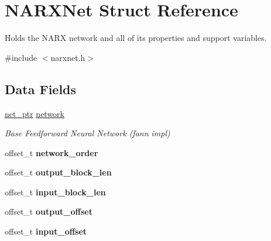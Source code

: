 \hypertarget{struct_n_a_r_x_net}{\section{N\-A\-R\-X\-Net Struct Reference}
\label{struct_n_a_r_x_net}
}


Holds the N\-A\-R\-X network and all of its properties and support variables.  




{\ttfamily \#include $<$narxnet.\-h$>$}

\subsection*{Data Fields}
\begin{DoxyCompactItemize}
\item 
\hypertarget{struct_n_a_r_x_net_a8a9ba7086d06adec09cab2f884bc094a}{\hyperlink{structfann}{net\-\_\-ptr} \hyperlink{struct_n_a_r_x_net_a8a9ba7086d06adec09cab2f884bc094a}{network}}\label{struct_n_a_r_x_net_a8a9ba7086d06adec09cab2f884bc094a}

\begin{DoxyCompactList}\small\item\em Base Feedforward Neural Network (fann impl) \end{DoxyCompactList}\item 
\hypertarget{struct_n_a_r_x_net_a4d817ef94b1503cd6db611b900b91b26}{offset\-\_\-t {\bfseries network\-\_\-order}}\label{struct_n_a_r_x_net_a4d817ef94b1503cd6db611b900b91b26}

\item 
\hypertarget{struct_n_a_r_x_net_a01ee3305920322a34b93757808ef13f7}{offset\-\_\-t {\bfseries output\-\_\-block\-\_\-len}}\label{struct_n_a_r_x_net_a01ee3305920322a34b93757808ef13f7}

\item 
\hypertarget{struct_n_a_r_x_net_affec2577f520fdc6d244dee87bf543ac}{offset\-\_\-t {\bfseries input\-\_\-block\-\_\-len}}\label{struct_n_a_r_x_net_affec2577f520fdc6d244dee87bf543ac}

\item 
\hypertarget{struct_n_a_r_x_net_a97e4b7c187d589c7180a6a03a110065b}{offset\-\_\-t {\bfseries output\-\_\-offset}}\label{struct_n_a_r_x_net_a97e4b7c187d589c7180a6a03a110065b}

\item 
\hypertarget{struct_n_a_r_x_net_acb91dae135ff8dad169905cd29e0787b}{offset\-\_\-t {\bfseries input\-\_\-offset}}\label{struct_n_a_r_x_net_acb91dae135ff8dad169905cd29e0787b}


\end{DoxyCompactItemize}
